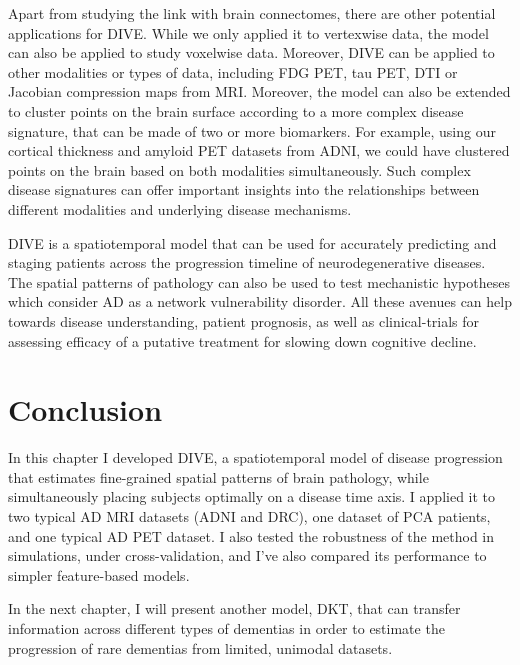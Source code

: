 Apart from studying the link with brain connectomes, there are other potential applications for DIVE. While we only applied it to vertexwise data, the model can also be applied to study voxelwise data. Moreover, DIVE can be applied to other modalities or types of data, including FDG PET, tau PET, DTI or Jacobian compression maps from MRI. Moreover, the model can also be extended to cluster points on the brain surface according to a more complex disease signature, that can be made of two or more biomarkers. For example, using our cortical thickness and amyloid PET datasets from ADNI, we could have clustered points on the brain based on both modalities simultaneously. Such complex disease signatures can offer important insights into the relationships between different modalities and underlying disease mechanisms.

DIVE is a spatiotemporal model that can be used for accurately predicting and staging patients across the progression timeline of neurodegenerative diseases. The spatial patterns of pathology can also be used to test mechanistic hypotheses which consider AD as a network vulnerability disorder. All these avenues can help towards disease understanding, patient prognosis, as well as clinical-trials for assessing efficacy of a putative treatment for slowing down cognitive decline.

\section{Conclusion}
\label{sec:diveConclusion}

In this chapter I developed DIVE, a spatiotemporal model of disease progression that estimates fine-grained spatial patterns of brain pathology, while simultaneously placing subjects optimally on a disease time axis. I applied it to two typical AD MRI datasets (ADNI and DRC), one dataset of PCA patients, and one typical AD PET dataset. I also tested the robustness of the method in simulations, under cross-validation, and I've also compared its performance to simpler feature-based models.

In the next chapter, I will present another model, DKT, that can transfer information across different types of dementias in order to estimate the progression of rare dementias from limited, unimodal datasets. 
